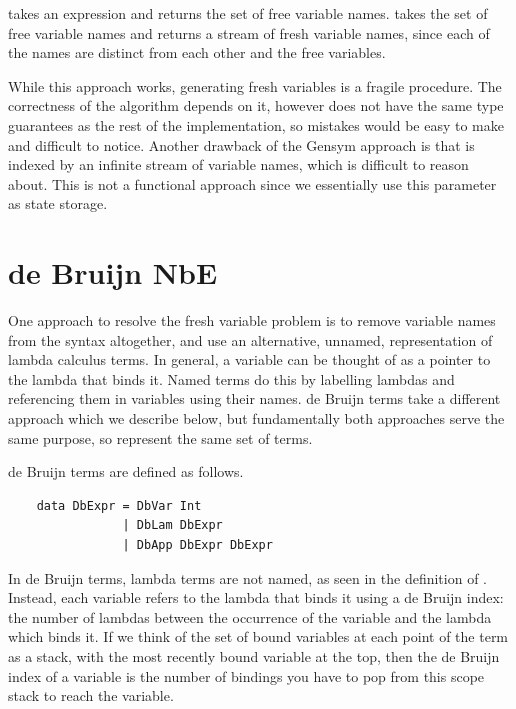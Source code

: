  takes an expression and returns the set of free variable names.  takes the set of free variable names and returns a stream of fresh variable names, since each of the names are distinct from each other and the free variables.

While this approach works, generating fresh variables is a fragile procedure. The correctness of the algorithm depends on it, however  does not have the same type guarantees as the rest of the implementation, so mistakes would be easy to make and difficult to notice. Another drawback of the Gensym approach is that  is indexed by an infinite stream of variable names, which is difficult to reason about. This is not a functional approach since we essentially use this parameter as state storage. 

\section{de Bruijn NbE}

One approach to resolve the fresh variable problem is to remove variable names from the syntax altogether, and use an alternative, unnamed, representation of lambda calculus terms. In general, a variable can be thought of as a pointer to the lambda that binds it. Named terms do this by labelling lambdas and referencing them in variables using their names. de Bruijn terms take a different approach which we describe below, but fundamentally both approaches serve the same purpose, so represent the same set of terms.

de Bruijn terms are defined as follows. \cite{deBruijnNotation}

\begin{lstlisting}
    data DbExpr = DbVar Int
                | DbLam DbExpr
                | DbApp DbExpr DbExpr
\end{lstlisting}

In de Bruijn terms, lambda terms are not named, as seen in the definition of . Instead, each variable refers to the lambda that binds it using a de Bruijn index: the number of lambdas between the occurrence of the variable and the lambda which binds it. If we think of the set of bound variables at each point of the term as a stack, with the most recently bound variable at the top, then the de Bruijn index of a variable is the number of bindings you have to pop from this scope stack to reach the variable.

